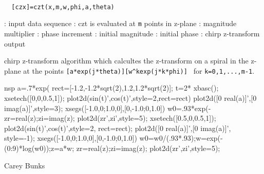 
\begin{mandesc}
   \\ %
\end{mandesc}
\begin{calling_sequence}
\begin{verbatim}
  [czx]=czt(x,m,w,phi,a,theta)  
\end{verbatim}
\end{calling_sequence}
\begin{parameters}
  \begin{varlist}
    : input data sequence
    : czt is evaluated at \verb!m! points in z-plane
    : magnitude multiplier
    : phase increment
    : initial magnitude
    : initial phase
    : chirp z-transform output
  \end{varlist}
\end{parameters}
\begin{mandescription}
  chirp z-transform algorithm which calcultes the z-transform on a
  spiral in the z-plane at the points
  \verb![a*exp(j*theta)][w^kexp(j*k*phi)] ! for
  \verb!k=0,1,...,m-1!.
\end{mandescription}
\begin{examples}
  \begin{mintednsp}{nsp}
    a=.7*exp(%
    rect=[-1.2,-1.2*sqrt(2),1.2,1.2*sqrt(2)];
    t=2*%
    xbasc();
    xsetech([0,0,0.5,1]);
    plot2d(sin(t)',cos(t)',style=2,rect=rect)
    plot2d([0 real(a)]',[0 imag(a)]',style=3);
    xsegs([-1.0,0;1.0,0],[0,-1.0;0,1.0])
    w0=.93*exp(-%
    zr=real(z);zi=imag(z);
    plot2d(zr',zi',style=5);
    xsetech([0.5,0,0.5,1]);
    plot2d(sin(t)',cos(t)',style=2, rect=rect);
    plot2d([0 real(a)]',[0 imag(a)]', style=-1);
    xsegs([-1.0,0;1.0,0],[0,-1.0;0,1.0])
    w0=w0/(.93*.93);w=exp(-(0:9)*log(w0));z=a*w;
    zr=real(z);zi=imag(z);
    plot2d(zr',zi',style=5);
  \end{mintednsp}
\end{examples}
\begin{authors}
  Carey Bunks
\end{authors}
